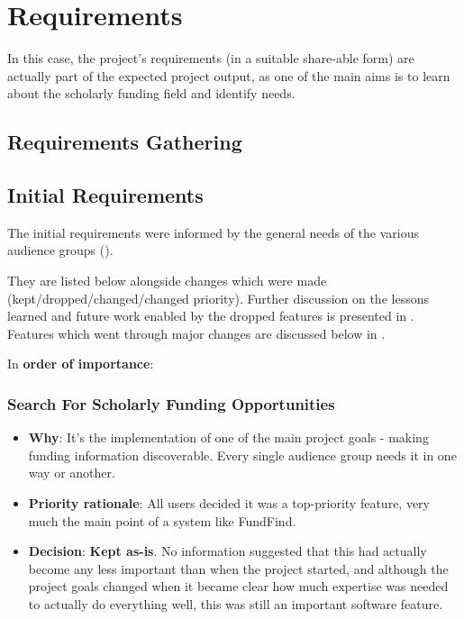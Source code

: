 \section{Requirements}


In this case, the project's requirements (in a suitable share-able form) are actually part of the expected project output, as one of the main aims is to learn about the scholarly funding field and identify needs.

\subsection{Requirements Gathering}



\subsection{Initial Requirements}
The initial requirements were informed by the general needs of the various audience groups ().

They are listed below alongside changes which were made (kept/dropped/changed/changed priority). Further discussion on the lessons learned and future work enabled by the dropped features is presented in . Features which went through major changes are discussed below in .

In \textbf{order of importance}:
\subsubsection{Search For Scholarly Funding Opportunities}
\begin{itemize}
 \item \textbf{Why}: It's the implementation of one of the main project goals - making funding information discoverable. Every single audience group needs it in one way or another.
 \item \textbf{Priority rationale}: All users decided it was a top-priority feature, very much the main point of a system like FundFind.
 \item \textbf{Decision}: \textbf{Kept as-is}. No information suggested that this had actually become any less important than when the project started, and although the project goals changed when it became clear how much expertise was needed to actually do everything well, this was still an important software feature.
\end{itemize}

